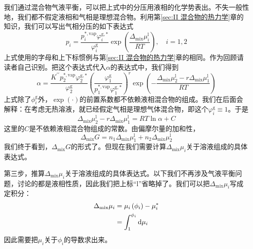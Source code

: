 \documentclass[main.tex]{subfiles}
\begin{document}
我们通过混合物气液平衡，可以把上式中的分压用液相的化学势表出。不失一般性地，我们都不假定液相和气相是理想混合物。利用第\ref{sec:II 混合物的热力学}章的知识，我们可以写出气相分压的如下表达式
\[p_i=\frac{p_i^{*,\text{vap}}\varphi_i^{\text{g},*}}{\varphi_i^\text{g}}\exp\left(\frac{\Delta_\text{mix}\mu_i^\text{l}}{RT}\right),\quad i=1,2\]
上式使用的字母和上下标惯例与第\ref{sec:II 混合物的热力学}章的相同。作为回顾请读者自己识别。把这个表达式代入$\alpha$的表达式中，我们得到
\[\alpha=\frac{K^{\prime\prime}p_2^{*,\text{vap}}\varphi_2^{\text{g},*}}{\varphi_2^\text{g}}\left(\frac{\varphi_1^\text{g}}{p_1^{*,\text{vap}}\varphi_1^{\text{g},*}}\right)^r\exp\left(-\frac{\Delta_\text{mix}\mu_2^\text{l}-r\Delta_\text{mix}\mu_1^\text{l}}{RT}\right)\]
上式除了$\phi_i^\text{g}$外，$\exp\left(\cdot\right)$的前置系数都不依赖液相混合物的组成。我们在后面会解释：在考虑无热溶液，就已经假定气相是理想气体混合物，即这个$\varphi_i^\text{g}\equiv 1$。于是
\begin{equation}\label{eq:III.3 alpha_mu_relation}\Delta_\text{mix}\mu_2^\text{l}-r\Delta_\text{mix}\mu_1^\text{l}=RT\ln\alpha+C\end{equation}
这里的$C$是不依赖液相混合物组成的常数。由偏摩尔量的加和性，
\[\Delta_\text{mix} G=n_1\Delta_\text{mix}\mu_1^\text{l}+n_2\Delta_\text{mix}\mu_2^\text{l}\]
我们终于看到，$\Delta_\text{mix} G$的形式了。但现在我们需要计算$\Delta_\text{mix}\mu_i$关于溶液组成的具体表达式。

第三步，推算$\Delta_\text{mix}\mu_i$关于溶液组成的具体表达式。以下我们不再涉及气液平衡问题，讨论的都是液相性质，因此我们把上标“l”省略掉了。我们可以把$\Delta_\text{mix}\mu_i$写成定积分：
\begin{align}
    \Delta_\text{mix}\mu_i & = \mu_i\left(\phi_i\right) - \mu_i^*                             \notag \\
                           & = \int_1^{\phi_i}\mathrm{d}\mu_i\label{eq:III.3 delta_mix_mu_integral}
\end{align}
因此需要把$\mu_i$关于$\phi_i$的导数求出来。
\end{document}
